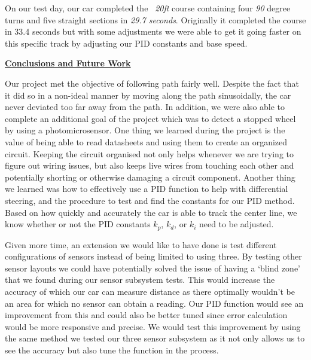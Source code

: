 \documentclass[twocolumn]{article}
\newcommand{\sectionTitle}[1]{ {\large\textbf{\uline{#1}}} \\ \vspace{1.5em} }
\begin{document}
\begin{flushleft}
		\hspace{1em}On our test day, our car completed the \textit{~20ft} course containing four \textit{90} degree turns and five straight sections in \textit{29.7 seconds}. Originally it completed the course in 33.4 seconds but with some adjustments we were able to get it going faster on this specific track by adjusting our PID constants and base speed. \\ \vspace{1em}
			
		\sectionTitle{Conclusions and Future Work}
			
		\hspace{1em}Our project met the objective of following path fairly well. Despite the fact that it did so in a non-ideal manner by moving along the path sinusoidally, the car never deviated too far away from the path. In addition, we were also able to complete an additional goal of the project which was to detect a stopped wheel by using a photomicrosensor. One thing we learned during the project is the value of being able to read datasheets and using them to create an organized circuit. Keeping the circuit organised not only helps whenever we are trying to figure out wiring issues, but also keeps live wires from touching each other and potentially shorting or otherwise damaging a circuit component. Another thing we learned was how to effectively use a PID function to help with differential steering, and the procedure to test and find the constants for our PID method. Based on how quickly and accurately the car is able to track the center line, we know whether or not the PID constants $k_p$, $k_d$, or $k_i$ need to be adjusted. \\ \vspace{1em}
		
		\hspace{1em}Given more time, an extension we would like to have done is test different configurations of sensors instead of being limited to using three. By testing other sensor layouts we could have potentially solved the issue of having a `blind zone’ that we found during our sensor subsystem tests. This would increase the accuracy of which our car can measure distance as there optimally wouldn’t be an area for which no sensor can obtain a reading. Our PID function would see an improvement from this and could also be better tuned since error calculation would be more responsive and precise. We would test this improvement by using the same method we tested our three sensor subsystem as it not only allows us to see the accuracy but also tune the function in the process. \\ \vspace{-54em}


\end{flushleft}
\end{document}
